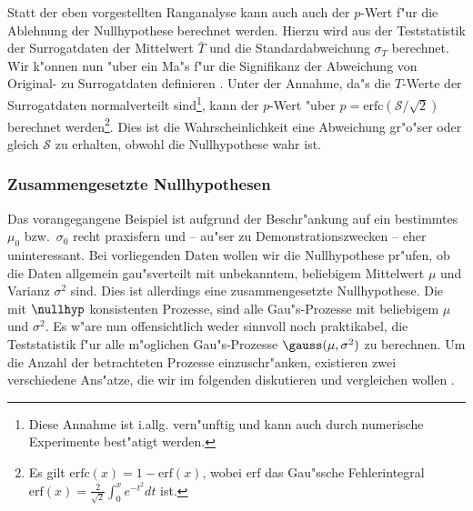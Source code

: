 Statt der eben vorgestellten Ranganalyse kann auch auch der $p$-Wert f"ur die Ablehnung der
Nullhypothese berechnet werden. Hierzu wird aus der Teststatistik der Surrogatdaten der
Mittelwert $\bar T$ und die Standardabweichung $\sigma_T$ berechnet. Wir k"onnen nun "uber
ein Ma"s f"ur die Signifikanz der Abweichung von Original- zu Surrogatdaten definieren
\cite{Theiler92b}. Unter der Annahme, da"s die $T$-Werte der Surrogatdaten normalverteilt
sind\footnote{Diese Annahme ist i.allg. vern"unftig und kann auch durch numerische
  Experimente best"atigt werden.}, kann der $p$-Wert "uber $p =
\mathrm{erfc}(\mathcal{S}/\sqrt2)$ berechnet werden\footnote{Es gilt
  $\mathrm{erfc}(x)=1-\mathrm{erf}(x)$, wobei $\mathrm{erf}$ das Gau"ssche Fehlerintegral
  $\mathrm{erf}(x)=\frac2{\sqrt{2}}\int_0^xe^{-t^2} dt$ ist. }.  Dies ist die
Wahrscheinlichkeit eine Abweichung gr"o"ser oder gleich $\mathcal{S}$ zu erhalten, obwohl
die Nullhypothese wahr ist.


\subsubsection{Zusammengesetzte Nullhypothesen}
Das vorangegangene Beispiel ist aufgrund der Beschr"ankung auf ein bestimmtes $\mu_0$
bzw.\ $\sigma_0$ recht praxisfern und -- au"ser zu Demonstrationszwecken -- eher
uninteressant. Bei vorliegenden Daten wollen wir die Nullhypothese pr"ufen, ob die Daten
allgemein gau"sverteilt mit unbekanntem, beliebigem Mittelwert $\mu$ und Varianz
$\sigma^2$ sind. Dies ist allerdings eine zusammengesetzte Nullhypothese. Die mit
$\nullhyp$ konsistenten Prozesse, sind alle Gau"s-Prozesse mit beliebigem $\mu$ und
$\sigma^2$. Es w"are nun offensichtlich weder sinnvoll noch praktikabel, die Teststatistik
 f"ur alle m"oglichen Gau"s-Prozesse $\gauss(\mu,\sigma^2)$ zu
berechnen. Um die Anzahl der betrachteten Prozesse einzuschr"anken, existieren zwei
verschiedene Ans"atze, die wir im folgenden diskutieren und vergleichen wollen
\cite{Prichard-theiler3}.

